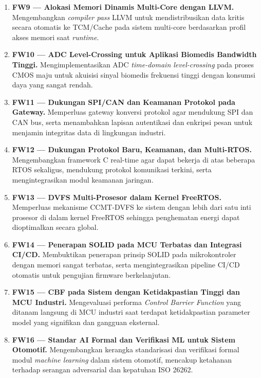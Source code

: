 \documentclass[12pt,a4paper]{article}
\begin{document}
\begin{enumerate}
    \item \textbf{FW9 --- Alokasi Memori Dinamis Multi-Core dengan LLVM.}
    Mengembangkan \textit{compiler pass} LLVM untuk mendistribusikan data kritis secara otomatis ke TCM/Cache pada sistem multi-core berdasarkan profil akses memori saat \textit{runtime}.

    \item \textbf{FW10 --- ADC Level-Crossing untuk Aplikasi Biomedis Bandwidth Tinggi.}
    Mengimplementasikan ADC \textit{time-domain level-crossing} pada proses CMOS maju untuk akuisisi sinyal biomedis frekuensi tinggi dengan konsumsi daya yang sangat rendah.

    \item \textbf{FW11 --- Dukungan SPI/CAN dan Keamanan Protokol pada Gateway.}
    Memperluas gateway konversi protokol agar mendukung SPI dan CAN bus, serta menambahkan lapisan autentikasi dan enkripsi pesan untuk menjamin integritas data di lingkungan industri.

    \item \textbf{FW12 --- Dukungan Protokol Baru, Keamanan, dan Multi-RTOS.}
    Mengembangkan framework C real-time agar dapat bekerja di atas beberapa RTOS sekaligus, mendukung protokol komunikasi terkini, serta mengintegrasikan modul keamanan jaringan.

    \item \textbf{FW13 --- DVFS Multi-Prosesor dalam Kernel FreeRTOS.}
    Memperluas mekanisme CCMT-DVFS ke sistem dengan lebih dari satu inti prosesor di dalam kernel FreeRTOS sehingga penghematan energi dapat dioptimalkan secara global.

    \item \textbf{FW14 --- Penerapan SOLID pada MCU Terbatas dan Integrasi CI/CD.}
    Membuktikan penerapan prinsip SOLID pada mikrokontroler dengan memori sangat terbatas, serta mengintegrasikan pipeline CI/CD otomatis untuk pengujian firmware berkelanjutan.

    \item \textbf{FW15 --- CBF pada Sistem dengan Ketidakpastian Tinggi dan MCU Industri.}
    Mengevaluasi performa \textit{Control Barrier Function} yang ditanam langsung di MCU industri saat terdapat ketidakpastian parameter model yang signifikan dan gangguan eksternal.

    \item \textbf{FW16 --- Standar AI Formal dan Verifikasi ML untuk Sistem Otomotif.}
    Mengembangkan kerangka standarisasi dan verifikasi formal modul \textit{machine learning} dalam sistem otomotif, mencakup ketahanan terhadap serangan adversarial dan kepatuhan ISO 26262.
\end{enumerate}
\end{document}
